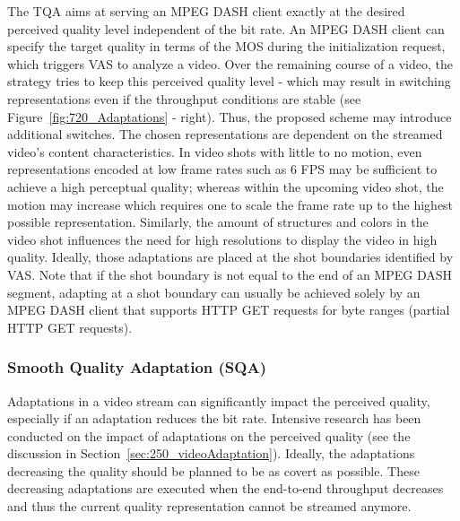 The \ac{TQA} aims at serving an \ac{MPEG} \ac{DASH} client exactly at the desired perceived quality level independent of the bit rate. 
An \ac{MPEG} \ac{DASH} client can specify the target quality in terms of the \ac{MOS} during the initialization request, which triggers \ac{VAS} to analyze a video.
Over the remaining course of a video, the strategy tries to keep this perceived quality level - which may result in switching representations even if the throughput conditions are stable (see Figure~\ref{fig:720_Adaptations} - right).
Thus, the proposed scheme may introduce additional switches.
The chosen representations are dependent on the streamed video's content characteristics. 
In video shots with little to no motion, even representations encoded at low frame rates such as 6 \ac{FPS} may be sufficient to achieve a high perceptual quality; whereas within the upcoming video shot, the motion may increase which requires one to scale the frame rate up to the highest possible representation. Similarly, the amount of structures and colors in the video shot influences the need for high resolutions to display the video in high quality. Ideally, those adaptations are placed at the shot boundaries identified by \ac{VAS}. Note that if the shot boundary is not equal to the end of an \ac{MPEG} \ac{DASH} segment, adapting at a shot boundary can usually be achieved solely by an \ac{MPEG} \ac{DASH} client that supports HTTP GET requests for byte ranges (partial HTTP GET requests).
\subsubsection{Smooth Quality Adaptation (SQA)}
\label{sec:726_smooth_adaptation}
Adaptations in a video stream can significantly impact the perceived quality, especially if an adaptation reduces the bit rate. Intensive research has been conducted on the impact of adaptations on the perceived quality (see the discussion in Section~\ref{sec:250_videoAdaptation}). 
Ideally, the adaptations decreasing the quality should be planned to be as covert as possible.
These decreasing adaptations are executed when the end-to-end throughput decreases and thus the current quality representation cannot be streamed anymore. 

